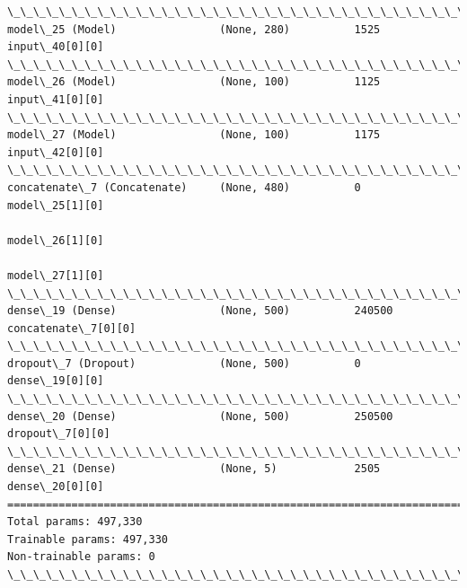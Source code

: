 \documentclass[11pt]{article}
\begin{document}
\begin{Verbatim}[commandchars=\\\{\}]
\_\_\_\_\_\_\_\_\_\_\_\_\_\_\_\_\_\_\_\_\_\_\_\_\_\_\_\_\_\_\_\_\_\_\_\_\_\_\_\_\_\_\_\_\_\_\_\_\_\_\_\_\_\_\_\_\_\_\_\_\_\_\_\_\_\_\_\_\_\_\_\_\_\_\_\_\_\_\_\_\_\_\_\_\_\_\_\_\_\_\_\_\_\_\_\_\_\_
model\_25 (Model)                (None, 280)          1525        input\_40[0][0]                   
\_\_\_\_\_\_\_\_\_\_\_\_\_\_\_\_\_\_\_\_\_\_\_\_\_\_\_\_\_\_\_\_\_\_\_\_\_\_\_\_\_\_\_\_\_\_\_\_\_\_\_\_\_\_\_\_\_\_\_\_\_\_\_\_\_\_\_\_\_\_\_\_\_\_\_\_\_\_\_\_\_\_\_\_\_\_\_\_\_\_\_\_\_\_\_\_\_\_
model\_26 (Model)                (None, 100)          1125        input\_41[0][0]                   
\_\_\_\_\_\_\_\_\_\_\_\_\_\_\_\_\_\_\_\_\_\_\_\_\_\_\_\_\_\_\_\_\_\_\_\_\_\_\_\_\_\_\_\_\_\_\_\_\_\_\_\_\_\_\_\_\_\_\_\_\_\_\_\_\_\_\_\_\_\_\_\_\_\_\_\_\_\_\_\_\_\_\_\_\_\_\_\_\_\_\_\_\_\_\_\_\_\_
model\_27 (Model)                (None, 100)          1175        input\_42[0][0]                   
\_\_\_\_\_\_\_\_\_\_\_\_\_\_\_\_\_\_\_\_\_\_\_\_\_\_\_\_\_\_\_\_\_\_\_\_\_\_\_\_\_\_\_\_\_\_\_\_\_\_\_\_\_\_\_\_\_\_\_\_\_\_\_\_\_\_\_\_\_\_\_\_\_\_\_\_\_\_\_\_\_\_\_\_\_\_\_\_\_\_\_\_\_\_\_\_\_\_
concatenate\_7 (Concatenate)     (None, 480)          0           model\_25[1][0]                   
                                                                 model\_26[1][0]                   
                                                                 model\_27[1][0]                   
\_\_\_\_\_\_\_\_\_\_\_\_\_\_\_\_\_\_\_\_\_\_\_\_\_\_\_\_\_\_\_\_\_\_\_\_\_\_\_\_\_\_\_\_\_\_\_\_\_\_\_\_\_\_\_\_\_\_\_\_\_\_\_\_\_\_\_\_\_\_\_\_\_\_\_\_\_\_\_\_\_\_\_\_\_\_\_\_\_\_\_\_\_\_\_\_\_\_
dense\_19 (Dense)                (None, 500)          240500      concatenate\_7[0][0]              
\_\_\_\_\_\_\_\_\_\_\_\_\_\_\_\_\_\_\_\_\_\_\_\_\_\_\_\_\_\_\_\_\_\_\_\_\_\_\_\_\_\_\_\_\_\_\_\_\_\_\_\_\_\_\_\_\_\_\_\_\_\_\_\_\_\_\_\_\_\_\_\_\_\_\_\_\_\_\_\_\_\_\_\_\_\_\_\_\_\_\_\_\_\_\_\_\_\_
dropout\_7 (Dropout)             (None, 500)          0           dense\_19[0][0]                   
\_\_\_\_\_\_\_\_\_\_\_\_\_\_\_\_\_\_\_\_\_\_\_\_\_\_\_\_\_\_\_\_\_\_\_\_\_\_\_\_\_\_\_\_\_\_\_\_\_\_\_\_\_\_\_\_\_\_\_\_\_\_\_\_\_\_\_\_\_\_\_\_\_\_\_\_\_\_\_\_\_\_\_\_\_\_\_\_\_\_\_\_\_\_\_\_\_\_
dense\_20 (Dense)                (None, 500)          250500      dropout\_7[0][0]                  
\_\_\_\_\_\_\_\_\_\_\_\_\_\_\_\_\_\_\_\_\_\_\_\_\_\_\_\_\_\_\_\_\_\_\_\_\_\_\_\_\_\_\_\_\_\_\_\_\_\_\_\_\_\_\_\_\_\_\_\_\_\_\_\_\_\_\_\_\_\_\_\_\_\_\_\_\_\_\_\_\_\_\_\_\_\_\_\_\_\_\_\_\_\_\_\_\_\_
dense\_21 (Dense)                (None, 5)            2505        dense\_20[0][0]                   
==================================================================================================
Total params: 497,330
Trainable params: 497,330
Non-trainable params: 0
\_\_\_\_\_\_\_\_\_\_\_\_\_\_\_\_\_\_\_\_\_\_\_\_\_\_\_\_\_\_\_\_\_\_\_\_\_\_\_\_\_\_\_\_\_\_\_\_\_\_\_\_\_\_\_\_\_\_\_\_\_\_\_\_\_\_\_\_\_\_\_\_\_\_\_\_\_\_\_\_\_\_\_\_\_\_\_\_\_\_\_\_\_\_\_\_\_\_

    \end{Verbatim}
\end{document}

